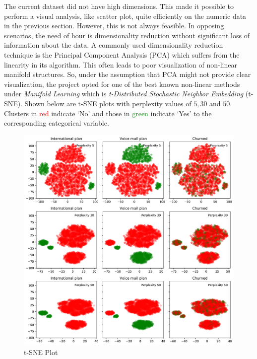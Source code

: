 \documentclass{article}
\begin{document}
The current dataset did not have high dimensions. This made it possible to perform a visual analysis, like scatter plot, quite efficiently on the numeric data in the previous section. However, this is not always feasible. In opposing scenarios, the need of hour is dimensionality reduction without significant loss of information about the data. A commonly used dimensionality reduction technique is the Principal Component Analysis (PCA) which suffers from the linearity in its algorithm. This often leads to poor visualization of non-linear manifold structures. So, under the assumption that PCA might not provide clear visualization, the project opted for one of the best known non-linear methods under \textit{Manifold Learning} which is \textit{t-Distributed Stochastic Neighbor Embedding} (t-SNE). Shown below are t-SNE plots with perplexity values of $5, 30$ and $50$. Clusters in \textcolor{red}{red} indicate `No' and those in \textcolor{green}{green} indicate `Yes' to the corresponding categorical variable.
\begin{figure}[H]
	\begin{center}
		\includegraphics[scale=0.40]{tsne.pdf}
	\end{center}
	\caption{t-SNE Plot}
\end{figure}
\end{document}
